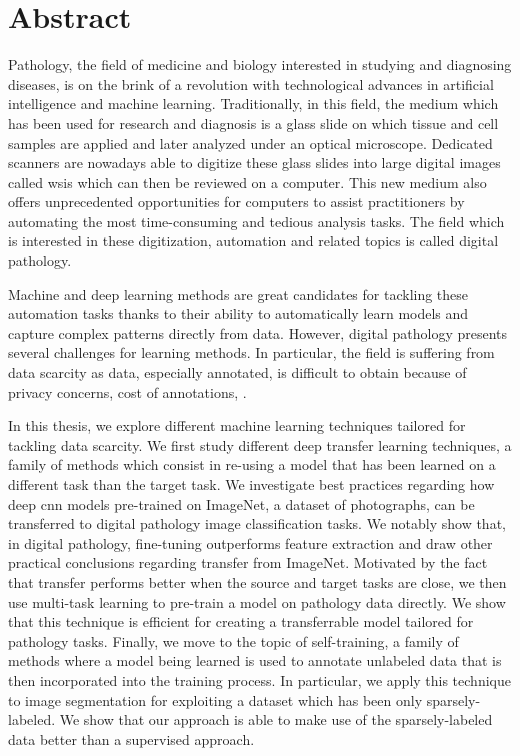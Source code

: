\chapter*{Abstract}

Pathology, the field of medicine and biology interested in studying and diagnosing diseases, is on the brink of a revolution with technological advances in artificial intelligence and machine learning. Traditionally, in this field, the medium which has been used for research and diagnosis is a glass slide on which tissue and cell samples are applied and later analyzed under an optical microscope. Dedicated scanners are nowadays able to digitize these glass slides into large digital images called \acrlong{wsi}s which can then be reviewed on a computer. This new medium also offers unprecedented opportunities for computers to assist practitioners by automating the most time-consuming and tedious analysis tasks. The field which is interested in these digitization, automation and related topics is called digital pathology.

Machine and deep learning methods are great candidates for tackling these automation tasks thanks to their ability to automatically learn models and capture complex patterns directly from data. However, digital pathology presents several challenges for learning methods. In particular, the field is suffering from data scarcity as data, especially annotated, is difficult to obtain because of privacy concerns, cost of annotations, \etc. 

In this thesis, we explore different machine learning techniques tailored for tackling data scarcity. We first study different deep transfer learning techniques, a family of methods which consist in re-using a model that has been learned on a different task than the target task. We investigate best practices regarding how deep \acrlong{cnn} models pre-trained on ImageNet, a dataset of photographs, can be transferred to digital pathology image classification tasks. We notably show that, in digital pathology, fine-tuning outperforms feature extraction and draw other practical conclusions regarding transfer from ImageNet. Motivated by the fact that transfer performs better when the source and target tasks are close, we then use multi-task learning to pre-train a model on pathology data directly. We show that this technique is efficient for creating a transferrable model tailored for pathology tasks. Finally, we move to the topic of self-training, a family of methods where a model being learned is used to annotate unlabeled data that is then incorporated into the training process. In particular, we apply this technique to image segmentation for exploiting a dataset which has been only sparsely-labeled. We show that our approach is able to make use of the sparsely-labeled data better than a supervised approach.
